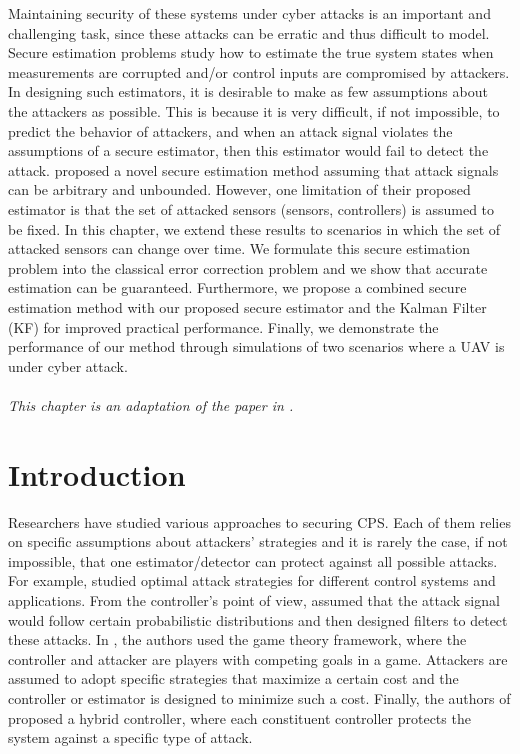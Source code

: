 \documentclass[../../thesis.tex]{subfiles}
\begin{document}
Maintaining security of these systems under cyber attacks is an important and challenging task, since these attacks can be erratic and thus difficult to model. Secure estimation problems study how to estimate the true system states when  measurements are corrupted and/or control inputs are compromised by attackers. 
In designing such estimators, it is desirable to make as few assumptions about the attackers as possible. This is because it is very difficult, if not impossible, to predict the behavior of attackers, and when an attack signal violates the assumptions of a secure estimator, then this estimator would fail to detect the attack.
\cite{Fawzi:2014} proposed a novel secure estimation method assuming that attack signals can be arbitrary and unbounded. However, one limitation of their proposed estimator is that the set of attacked sensors (sensors, controllers) is assumed to be fixed. 
In this chapter, we extend these results to scenarios in which the set of attacked sensors can change over time. We formulate this secure estimation problem into the classical error correction problem \cite{tao11} and we show that accurate estimation can be guaranteed. Furthermore, we propose a combined secure estimation method with our proposed secure estimator and the Kalman Filter (KF) for improved practical performance. Finally,  we demonstrate the performance of our method through simulations of two scenarios where a UAV is under cyber attack.
\\
\\
\noindent
\textit{This chapter is an adaptation of the paper in \cite{Hu:2016uav}.}

\section{Introduction}

Researchers have studied various approaches to securing CPS. Each of them relies on specific assumptions about attackers' strategies and it is rarely the case, if not impossible, that one estimator/detector can protect against all possible attacks. 
For example, \cite{Tong}\cite{KwonACC}\cite{liu2011false}\cite{teixeira2010cyber} studied optimal attack strategies for different control systems and applications. 
From the controller's point of view, \cite{Bullo, Liu} assumed that the attack signal would follow certain probabilistic distributions and then designed filters to detect these attacks.
In \cite{Wu, Basar, Basar2, Walrand, Pappas}, the authors used the game theory framework, where the controller and attacker are players with competing goals in a game. 
Attackers are assumed to adopt specific strategies that maximize a certain cost and the controller or estimator is designed to minimize such a cost.
Finally, the authors of \cite{KwonCDC} proposed a hybrid controller, where each constituent controller protects the system against a specific type of attack.
\end{document}
